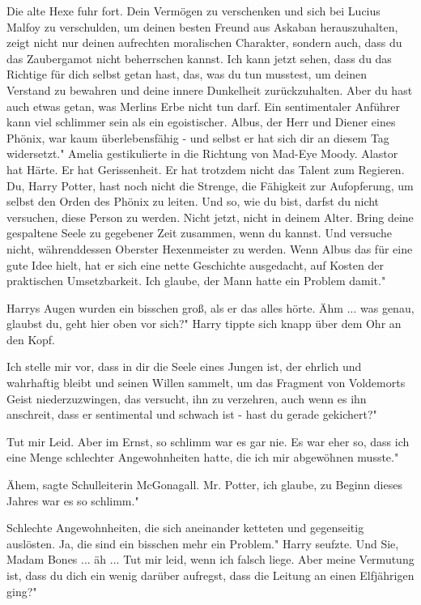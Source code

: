 Die alte Hexe fuhr fort. \glqq{}Dein Vermögen zu verschenken und sich bei Lucius
Malfoy zu verschulden, um deinen besten Freund aus Askaban herauszuhalten, zeigt
nicht nur deinen aufrechten moralischen Charakter, sondern auch, dass du das
Zaubergamot nicht beherrschen kannst. Ich kann jetzt sehen, dass du das Richtige
für dich selbst getan hast, das, was du tun musstest, um deinen Verstand zu
bewahren und deine innere Dunkelheit zurückzuhalten. Aber du hast auch etwas
getan, was Merlins Erbe nicht tun darf. Ein sentimentaler Anführer kann viel
schlimmer sein als ein egoistischer. Albus, der Herr und Diener eines Phönix,
war kaum überlebensfähig - und selbst er hat sich dir an diesem Tag widersetzt."
Amelia gestikulierte in die Richtung von Mad-Eye Moody. \glqq{}Alastor hat Härte.
Er hat Gerissenheit. Er hat trotzdem nicht das Talent zum Regieren. Du, Harry
Potter, hast noch nicht die Strenge, die Fähigkeit zur Aufopferung, um selbst
den Orden des Phönix zu leiten. Und so, wie du bist, darfst du nicht versuchen,
diese Person zu werden. Nicht jetzt, nicht in deinem Alter. Bring deine
gespaltene Seele zu gegebener Zeit zusammen, wenn du kannst. Und versuche nicht,
währenddessen Oberster Hexenmeister zu werden. Wenn Albus das für eine gute Idee
hielt, hat er sich eine nette Geschichte ausgedacht, auf Kosten der praktischen
Umsetzbarkeit. Ich glaube, der Mann hatte ein Problem damit."

Harrys Augen wurden ein bisschen groß, als er das alles hörte. \glqq{}Ähm ... was
genau, glaubst du, geht hier oben vor sich?" Harry tippte sich knapp über dem
Ohr an den Kopf.

\glqq{}Ich stelle mir vor, dass in dir die Seele eines Jungen ist, der ehrlich
und wahrhaftig bleibt und seinen Willen sammelt, um das Fragment von Voldemorts
Geist niederzuzwingen, das versucht, ihn zu verzehren, auch wenn es ihn
anschreit, dass er sentimental und schwach ist - hast du gerade gekichert?"

\glqq{}Tut mir Leid. Aber im Ernst, so schlimm war es gar nie. Es war eher so,
dass ich eine Menge schlechter Angewohnheiten hatte, die ich mir abgewöhnen
musste."

\glqq{}Ähem\grqq{}, sagte Schulleiterin McGonagall. \glqq{}Mr. Potter, ich glaube,
zu Beginn dieses Jahres war es so schlimm."

\glqq{}Schlechte Angewohnheiten, die sich aneinander ketteten und gegenseitig
auslösten. Ja, die sind ein bisschen mehr ein Problem." Harry seufzte. \glqq{}Und
Sie, Madam Bones ... äh ... Tut mir leid, wenn ich falsch liege. Aber meine
Vermutung ist, dass du dich ein wenig darüber aufregst, dass die Leitung an
einen Elfjährigen ging?"

